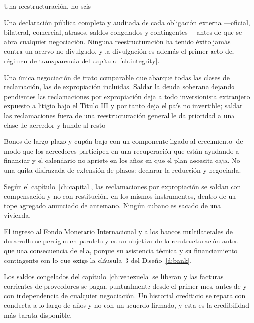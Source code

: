 \begin{design}{Una reestructuración, no seis}
\label{d:debt}
\begin{rules}
 Una declaración pública completa y auditada de cada obligación
externa ---oficial, bilateral, comercial, atrasos, saldos congelados y contingentes---
antes de que se abra cualquier negociación. Ninguna reestructuración ha tenido éxito
jamás contra un acervo no divulgado, y la divulgación es además el primer acto del
régimen de transparencia del capítulo~\ref{ch:integrity}.

 Una única negociación de trato comparable que abarque todas las
clases de reclamación, las de expropiación incluidas. Saldar la deuda soberana dejando
pendientes las reclamaciones por expropiación deja a todo inversionista extranjero
expuesto a litigio bajo el Título III y por tanto deja el país no invertible; saldar las
reclamaciones fuera de una reestructuración general le da prioridad a una clase de
acreedor y hunde al resto.

 Bonos de largo plazo y cupón bajo con un componente ligado al
crecimiento, de modo que los acreedores participen en una recuperación que están
ayudando a financiar y el calendario no apriete en los años en que el plan necesita
caja. No una quita disfrazada de extensión de plazos: declarar la reducción y
negociarla.

 Según el
capítulo~\ref{ch:capital}, las reclamaciones por expropiación se saldan con
compensación y no con restitución, en los mismos instrumentos, dentro de un tope
agregado anunciado de antemano. Ningún cubano es sacado de una vivienda.

 El ingreso al Fondo Monetario Internacional y a los bancos
multilaterales de desarrollo se persigue en paralelo y es un objetivo de la
reestructuración antes que una consecuencia de ella, porque su asistencia técnica y su
financiamiento contingente son lo que exige la cláusula~3 del Diseño~\ref{d:bank}.

 Los saldos congelados del
capítulo~\ref{ch:venezuela} se liberan y las facturas corrientes de proveedores se pagan
puntualmente desde el primer mes, antes de y con independencia de cualquier negociación.
Un historial crediticio se repara con conducta a lo largo de años y no con un acuerdo
firmado, y esta es la credibilidad más barata disponible.
\end{rules}
\end{design}


